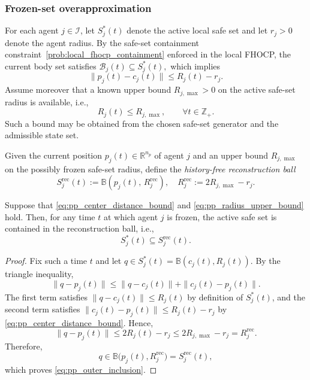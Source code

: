 \documentclass[twocolumn]{autart}
\begin{document}
\subsubsection{Frozen-set overapproximation}

For each agent $j\in\mathcal I$, let $S_j^\ast(t)$ denote the active local safe set and let $r_j>0$ denote the agent radius.
By the safe-set containment constraint~\eqref{prob:local_fhocp_containment} enforced in the local FHOCP, the current body set satisfies $\mathcal B_j(t)\subseteq S_j^\ast(t),$
which implies
\begin{equation}
\|p_j(t)-c_j(t)\|\le R_j(t)-r_j.
\label{eq:pp_center_distance_bound}
\end{equation}
Assume moreover that a known upper bound $R_{j,\max}>0$ on the active safe-set radius is available, i.e.,
\begin{equation}
R_j(t)\le R_{j,\max},
\qquad \forall t\in\mathbb Z_+.
\label{eq:pp_radius_upper_bound}
\end{equation}
Such a bound may be obtained from the chosen safe-set generator and the admissible state set.

\begin{definition}
\label{def:pp_reconstruction_ball_frozen}
Given the current position $p_j(t)\in\mathbb R^{n_p}$ of agent $j$ and an upper bound $R_{j,\max}$ on the possibly frozen safe-set radius, define the \emph{history-free reconstruction ball}
\begin{equation}
S_j^{\mathrm{rec}}(t)
:=
\mathbb{B}\!\left(p_j(t),\,R_j^{\mathrm{rec}}\right),
\quad
R_j^{\mathrm{rec}}:=2R_{j,\max}-r_j.
\label{eq:pp_rec_ball}
\end{equation}
\end{definition}

\begin{lemma}
\label{lem:pp_outer_approx_frozen}
Suppose that \eqref{eq:pp_center_distance_bound} and \eqref{eq:pp_radius_upper_bound} hold.
Then, for any time $t$ at which agent $j$ is frozen, the active safe set is contained in the reconstruction ball, i.e.,
\begin{equation}
S_j^\ast(t)\subseteq S_j^{\mathrm{rec}}(t).
\label{eq:pp_outer_inclusion}
\end{equation}
\end{lemma}
\begin{proof}
Fix such a time $t$ and let $q\in S_j^\ast(t)=\mathbb B(c_j(t),R_j(t))$.
By the triangle inequality,
\[
\|q-p_j(t)\|
\le
\|q-c_j(t)\|+\|c_j(t)-p_j(t)\|.
\]
The first term satisfies $\|q-c_j(t)\|\le R_j(t)$ by definition of $S_j^\ast(t)$, and the second term satisfies $\|c_j(t)-p_j(t)\|\le R_j(t)-r_j$
by \eqref{eq:pp_center_distance_bound}.
Hence,
\[
\|q-p_j(t)\|
\le
2R_j(t)-r_j
\le
2R_{j,\max}-r_j
=
R_j^{\mathrm{rec}}.
\]
Therefore,
\[
q\in \mathbb B\bigl(p_j(t),R_j^{\mathrm{rec}}\bigr)=S_j^{\mathrm{rec}}(t),
\]
which proves \eqref{eq:pp_outer_inclusion}.
\end{proof}
\end{document}
